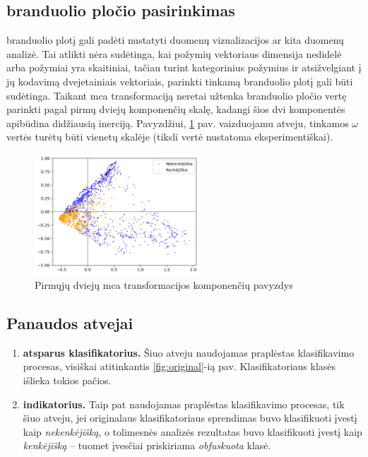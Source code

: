 \clearpage
\subsection{\LIME branduolio pločio pasirinkimas}
\LIME branduolio plotį  gali padėti nustatyti duomenų vizualizacijos ar kita duomenų analizė. Tai atlikti nėra sudėtinga, kai požymių vektoriaus dimensija nedidelė arba požymiai yra skaitiniai, tačiau turint kategorinius požymius ir atsižvelgiant į jų kodavimą dvejetainiais vektoriais, parinkti tinkamą \LIME branduolio plotį gali būti sudėtinga. Taikant \gls{mca} transformaciją neretai užtenka branduolio pločio vertę parinkti pagal pirmų dviejų komponenčių skalę, kadangi šios dvi komponentės apibūdina didžiausią inerciją. Pavyzdžiui, \ref{fig:scree} pav. vaizduojamu atveju, tinkamos $\omega$ vertės turėtų būti vienetų skalėje (tiksli vertė nustatoma eksperimentiškai).
\begin{figure}[h]
        \centering
        \includegraphics[width=0.55\textwidth]{images/mca_scatter.png}
        \caption{Pirmųjų dviejų \gls{mca} transformacijos komponenčių pavyzdys}
        \label{fig:scree}
\end{figure}

\subsection{Panaudos atvejai}\label{sec:method:usecases}
\begin{enumerate}
    \item {\bfseries {} atsparus klasifikatorius.}
     Šiuo atveju naudojamas praplėstas klasifikavimo procesas, visiškai atitinkantis \ref{fig:original}-ią pav. Klasifikatoriaus klasės išlieka tokios pačios. 
    \item {\bfseries {} indikatorius.} 
    Taip pat naudojamas praplėstas klasifikavimo procesas, tik šiuo atveju, jei originalaus klasifikatoriaus sprendimas buvo klasifikuoti įvestį kaip \textit{nekenkėjišką}, o tolimesnės analizės rezultatas buvo klasifikuoti įvestį kaip \textit{kenkėjišką} -- tuomet įvesčiai priskiriama \textit{obfuskuota} klasė. 
\end{enumerate}

